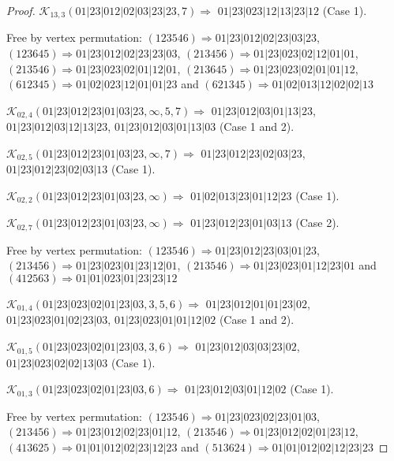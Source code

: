 \documentclass[12pt]{article}
\theoremstyle{plain}
\theoremstyle{definition}
\theoremstyle{remark}
\newcommand{\fancy}[1]{\mathcal{#1}}
\def\K{\fancy{K}}
\begin{document}
\begin{proof}
	$\K_{13,3}(01|23|012|02|03|23|23,7)\Rightarrow $ $01|23|023|12|13|23|12$ (Case 1).
	
	
	
	Free by vertex permutation: $(1 2 3 5 4 6)\Rightarrow 01|23|012|02|23|03|23$, $(1 2 3 6 4 5)\Rightarrow 01|23|012|02|23|23|03$, $(2 1 3 4 5 6)\Rightarrow 01|23|023|02|12|01|01$, $(2 1 3 5 4 6)\Rightarrow 01|23|023|02|01|12|01$, $(2 1 3 6 4 5)\Rightarrow 01|23|023|02|01|01|12$, $(6 1 2 3 4 5)\Rightarrow 01|02|023|12|01|01|23$ and $(6 2 1 3 4 5)\Rightarrow 01|02|013|12|02|02|13$
	
	
	
	\bigskip
	
	$\K_{02,4}(01|23|012|23|01|03|23,\infty,5, 7)\Rightarrow $ $01|23|012|03|01|13|23$, $01|23|012|03|12|13|23$, $01|23|012|03|01|13|03$ (Case 1 and 2).
	
	$\K_{02,5}(01|23|012|23|01|03|23,\infty,7)\Rightarrow $ $01|23|012|23|02|03|23$, $01|23|012|23|02|03|13$ (Case 1).
	
	$\K_{02,2}(01|23|012|23|01|03|23,\infty)\Rightarrow $ $01|02|013|23|01|12|23$ (Case 1).
	
	$\K_{02,7}(01|23|012|23|01|03|23,\infty)\Rightarrow $ $01|23|012|23|01|03|13$ (Case 2).
	
	
	
	Free by vertex permutation: $(1 2 3 5 4 6)\Rightarrow 01|23|012|23|03|01|23$, $(2 1 3 4 5 6)\Rightarrow 01|23|023|01|23|12|01$, $(2 1 3 5 4 6)\Rightarrow 01|23|023|01|12|23|01$ and $(4 1 2 5 6 3)\Rightarrow 01|01|023|01|23|23|12$
	
	
	
	\bigskip
	
	$\K_{01,4}(01|23|023|02|01|23|03,3, 5, 6)\Rightarrow $ $01|23|012|01|01|23|02$, $01|23|023|01|02|23|03$, $01|23|023|01|01|12|02$ (Case 1 and 2).
	
	$\K_{01,5}(01|23|023|02|01|23|03,3, 6)\Rightarrow $ $01|23|012|03|03|23|02$, $01|23|023|02|02|13|03$ (Case 1).
	
	$\K_{01,3}(01|23|023|02|01|23|03,6)\Rightarrow $ $01|23|012|03|01|12|02$ (Case 1).
	
	
	
	Free by vertex permutation: $(1 2 3 5 4 6)\Rightarrow 01|23|023|02|23|01|03$, $(2 1 3 4 5 6)\Rightarrow 01|23|012|02|23|01|12$, $(2 1 3 5 4 6)\Rightarrow 01|23|012|02|01|23|12$, $(4 1 3 6 2 5)\Rightarrow 01|01|012|02|23|12|23$ and $(5 1 3 6 2 4)\Rightarrow 01|01|012|02|12|23|23$
	
	
	
	\bigskip
	

\end{proof}
\end{document}
